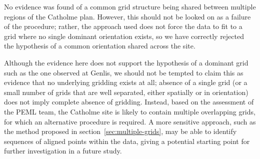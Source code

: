 \documentclass[../../ArchStats.tex]{subfiles}
\begin{document}
No evidence was found of a common grid structure being shared between multiple regions of the Catholme plan. However, this should not be looked on as a failure of the procedure; rather, the approach used does not force the data to fit to a grid where no single dominant orientation exists, so we have correctly rejected the hypothesis of a common orientation shared across the site.
 
Although the evidence here does not support the hypothesis of a dominant grid such as the one observed at Genlis, we should not be tempted to claim this as evidence  that no underlying gridding exists at all; absence of a single grid (or a small number of grids that are well separated, either spatially or in orientation) does not imply complete absence of gridding. Instead, based on the assessment of the PEML team, the Catholme site is likely to contain multiple overlapping grids, for which an alternative procedure is required. A more sensitive approach, such as the method proposed in section~\ref{sec:multiple-grids}, may be able to identify sequences of aligned points within the data, giving a potential starting point for further investigation in a future study.
\end{document}
